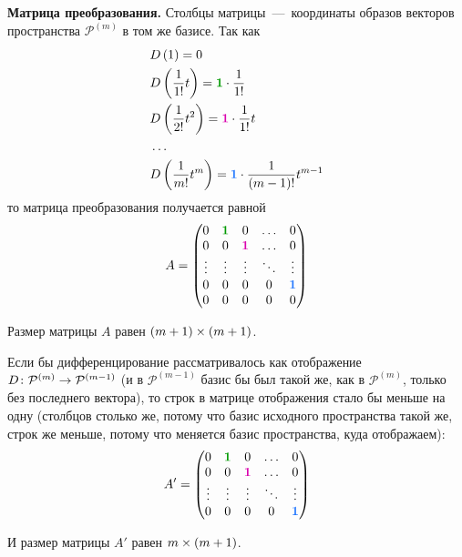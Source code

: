 \documentclass[a4paper,12pt]{article}
\begin{document}
\begin{solution}
    \textbf{Матрица преобразования.}
    Столбцы матрицы~---~координаты образов векторов пространства $\mathcal P^{(m)}$ в том же базисе.
    Так как
    \[
      \begin{aligned}
        &D\left(1\right) = 0\\
        &D\left(\frac{1}{1!} t\right) = \textcolor{green}{\bds 1} \cdot \frac{1}{1!}\\
        &D\left(\frac{1}{2!} t^2\right) = \textcolor{pink}{\bds 1} \cdot \frac{1}{1!} t\\
        &\ldots\\
        &D\left(\frac{1}{m!} t^m\right) = \textcolor{blue}{\bds 1} \cdot \frac{1}{(m - 1)!} t^{m - 1}
      \end{aligned}
    \]
    то матрица преобразования получается равной
    \[
      A = \begin{pmatrix}
        0      & \textcolor{green}{\bds 1} & 0                        & \ldots & 0\\
        0      & 0                         & \textcolor{pink}{\bds 1} & \ldots & 0\\
        \vdots & \vdots                    & \vdots                   & \ddots & \vdots\\
        0      & 0                         & 0                        & 0      & \textcolor{blue}{\bds 1}\\
        0      & 0                         & 0                        & 0      & 0
      \end{pmatrix}
    \]
    
    Размер матрицы $A$ равен $(m \hm+ 1) \hm\times (m \hm+ 1)$.
    
    Если бы дифференцирование рассматривалось как отображение $D \colon \mathcal P^{(m)} \hm\to \mathcal P^{(m - 1)}$ (и в $\mathcal P^{(m - 1)}$ базис бы был такой же, как в $\mathcal P^{(m)}$, только без последнего вектора), то строк в матрице отображения стало бы меньше на одну (столбцов столько же, потому что базис исходного пространства такой же, строк же меньше, потому что меняется базис пространства, куда отображаем):
    \[
      A' = \begin{pmatrix}
        0      & \textcolor{green}{\bds 1} & 0                        & \ldots & 0\\
        0      & 0                         & \textcolor{pink}{\bds 1} & \ldots & 0\\
        \vdots & \vdots                    & \vdots                   & \ddots & \vdots\\
        0      & 0                         & 0                        & 0      & \textcolor{blue}{\bds 1}
      \end{pmatrix}
    \]
    
    И размер матрицы $A'$ равен $m \hm\times (m \hm+ 1)$.
  \end{solution}
  
\end{document}
